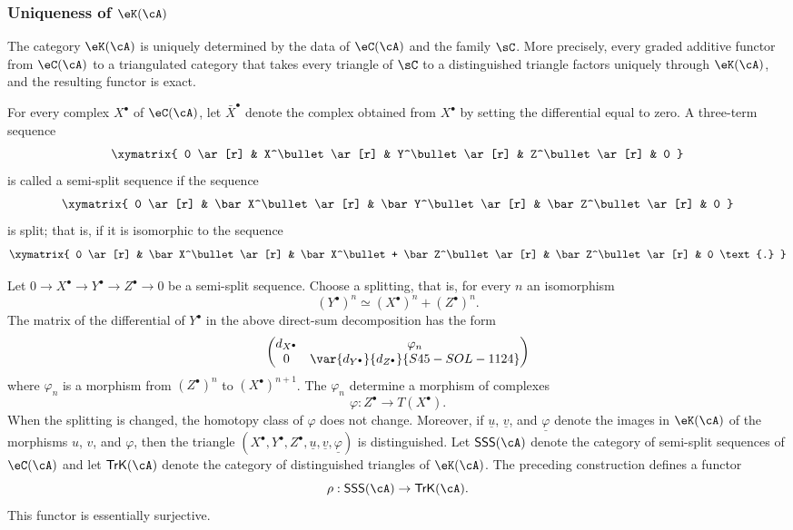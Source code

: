 \subsubsection{Uniqueness of $\eK(\cA)$}\label{VIII:1-2-4}

The category $\eK(\cA)$ is uniquely determined by the data of $\eC(\cA)$
and the family $\sC$. More precisely, every graded additive functor from
$\eC(\cA)$ to a triangulated category that takes every triangle of $\sC$
to a distinguished triangle factors uniquely through $\eK(\cA)$, and the
resulting functor is exact.

For every complex $X^\bullet$ of $\eC(\cA)$, let $\bar X^\bullet$ denote
the complex obtained from $X^\bullet$ by setting the differential equal
to zero. A three-term sequence
\[\xymatrix{
  0 \ar[r]
    & X^\bullet \ar[r]
    & Y^\bullet \ar[r]
    & Z^\bullet \ar[r]
    & 0
}\]
is called a semi-split sequence if the sequence
\[\xymatrix{
  0 \ar[r]
    & \bar X^\bullet \ar[r]
    & \bar Y^\bullet \ar[r]
    & \bar Z^\bullet \ar[r]
    & 0
}\]
is split; that is, if it is isomorphic to the sequence
\[\xymatrix{
  0 \ar[r]
    & \bar X^\bullet \ar[r]
    & \bar X^\bullet + \bar Z^\bullet \ar[r]
    & \bar Z^\bullet \ar[r]
    & 0 \text{.}
}\]

Let $0 \to X^\bullet \to Y^\bullet \to Z^\bullet \to 0$ be a semi-split
sequence. Choose a splitting, that is, for every $n$ an isomorphism
\[
  (Y^\bullet)^n \simeq (X^\bullet)^n + (Z^\bullet)^n \text{.}
\]
The matrix of the differential of $Y^\bullet$ in the above direct-sum
decomposition has the form
\[
  \begin{pmatrix}
    d_{X^\bullet} & \varphi_n \\
    0 & \var{d_{Y^\bullet}}{d_{Z^\bullet}}{S45-SOL-1124}
  \end{pmatrix}
\]
where $\varphi_n$ is a morphism from $(Z^\bullet)^n$ to
$(X^\bullet)^{n+1}$. The $\varphi_n$ determine a morphism of complexes
\[
  \varphi:Z^\bullet \to T(X^\bullet) \text{.}
\]
When the splitting is changed, the homotopy class of $\varphi$ does not
change. Moreover, if $\underline u$, $\underline v$, and
$\underline\varphi$ denote the images in $\eK(\cA)$ of the morphisms $u$,
$v$, and $\varphi$, then the triangle
$(X^\bullet,Y^\bullet,Z^\bullet,\underline u,\underline v,\underline\varphi)$
is distinguished. Let $\mathsf{SSS}(\cA)$ denote the category of
semi-split sequences of $\eC(\cA)$ and let $\mathsf{TrK}(\cA)$ denote the
category of distinguished triangles of $\eK(\cA)$. The preceding
construction defines a functor
\[
  \rho:\mathsf{SSS}(\cA) \to \mathsf{TrK}(\cA) \text{.}
\]
This functor is essentially surjective.

